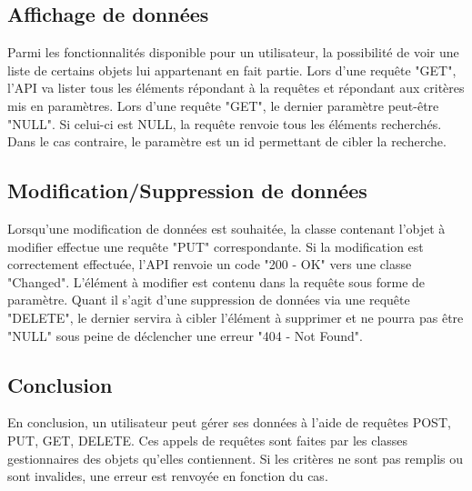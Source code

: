 \subsection{Affichage de données}
\begin{flushleft}
Parmi les fonctionnalités disponible pour un utilisateur, la possibilité de voir une liste de certains objets lui appartenant en fait partie. Lors d'une requête "GET", l'API va lister tous les éléments répondant à la requêtes et répondant aux critères mis en paramètres. Lors d'une requête "GET", le dernier paramètre peut-être "NULL". Si celui-ci est NULL, la requête renvoie tous les éléments recherchés. Dans le cas contraire, le paramètre est un id permettant de cibler la recherche.
\end{flushleft}

\subsection{Modification/Suppression de données}
\begin{flushleft}
Lorsqu'une modification de données est souhaitée, la classe contenant l'objet à modifier effectue une requête "PUT" correspondante. Si la modification est correctement effectuée, l'API renvoie un code "200 - OK" vers une classe "Changed". L'élément à modifier est contenu dans la requête sous forme de paramètre. Quant il s'agit d'une suppression de données via une requête "DELETE", le dernier servira à cibler l'élément à supprimer et ne pourra pas être "NULL" sous peine de déclencher une erreur "404 - Not Found".
\end{flushleft}

\subsection{Conclusion}
\begin{flushleft}
En conclusion, un utilisateur peut gérer ses données à l'aide de requêtes POST, PUT, GET, DELETE. Ces appels de requêtes sont faites par les classes gestionnaires des objets qu'elles contiennent. Si les critères ne sont pas remplis ou sont invalides, une erreur est renvoyée en fonction du cas.
\newpage

\end{flushleft}
